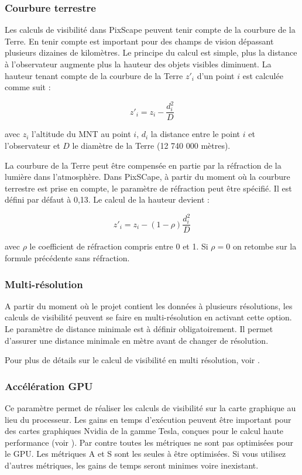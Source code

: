 \documentclass{report}
\begin{document}
\subsubsection{Courbure terrestre}
Les calculs de visibilité dans PixScape peuvent tenir compte de la courbure de la Terre. En tenir compte est important pour des champs de vision dépassant plusieurs dizaines de kilomètres. Le principe du calcul est simple, plus la distance à l'observateur augmente plus la hauteur des objets visibles diminuent. 
La hauteur tenant compte de la courbure de la Terre $z'_i$ d'un point $i$ est calculée comme suit : 

$$z'_i = z_i - \frac{d_i^2}{D}$$

avec $z_i$ l'altitude du MNT au point $i$, $d_i$ la distance entre le point $i$ et l'observateur et $D$ le diamètre de la Terre (12 740 000 mètres).

La courbure de la Terre peut être compensée en partie par la réfraction de la lumière dans l'atmosphère. Dans PixSCape, à partir du moment où la courbure terrestre est prise en compte, le paramètre de réfraction peut être spécifié. Il est défini par défaut à 0,13. Le calcul de la hauteur devient : 

$$z'_i = z_i - (1-\rho)\frac{d_i^2}{D}$$

avec $\rho$ le coefficient de réfraction compris entre 0 et 1. Si $\rho=0$ on retombe sur la formule précédente sans réfraction.


\subsubsection{Multi-résolution}
A partir du moment où le projet contient les données à plusieurs résolutions, les calculs de visibilité peuvent se faire en multi-résolution en activant cette option. Le paramètre de distance minimale est à définir obligatoirement. Il permet d'assurer une distance minimale en mètre avant de changer de résolution. 

Pour plus de détails sur le calcul de visibilité en multi résolution, voir .


\subsubsection{Accélération GPU}
Ce paramètre permet de réaliser les calculs de visibilité sur la carte graphique au lieu du processeur. Les gains en temps d'exécution peuvent être important pour des cartes graphiques Nvidia de la gamme Tesla, conçues pour le calcul haute performance (voir ). Par contre toutes les métriques ne sont pas optimisées pour le GPU. Les métriques A et S sont les seules à être optimisées. Si vous utilisez d'autres métriques, les gains de temps seront minimes voire inexistant.
\end{document}

